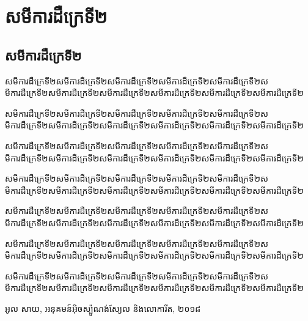 \documentclass[11pt,a5paper]{header}
\begin{document}
    \frontmatter{}
    \tableofcontents
    \mainmatter{}
    \chapter{សមីការដឺក្រេទី២}
    \section{សមីការដឺក្រេទី២}
    \begin{definition}
        សមីការដឺក្រេទី២សមីការដឺក្រេទី២សមីការដឺក្រេទី២សមីការដឺក្រេទី២សមីការដឺក្រេទី២សមីការដឺក្រេទី២សមីការដឺក្រេទី២សមីការដឺក្រេទី២សមីការដឺក្រេទី២សមីការដឺក្រេទី២សមីការដឺក្រេទី២
    \end{definition}
\begin{theorem}
    សមីការដឺក្រេទី២សមីការដឺក្រេទី២សមីការដឺក្រេទី២សមីការដឺក្រេទី២សមីការដឺក្រេទី២សមីការដឺក្រេទី២សមីការដឺក្រេទី២សមីការដឺក្រេទី២សមីការដឺក្រេទី២សមីការដឺក្រេទី២សមីការដឺក្រេទី២
\end{theorem}
\begin{example}
    សមីការដឺក្រេទី២សមីការដឺក្រេទី២សមីការដឺក្រេទី២សមីការដឺក្រេទី២សមីការដឺក្រេទី២សមីការដឺក្រេទី២សមីការដឺក្រេទី២សមីការដឺក្រេទី២សមីការដឺក្រេទី២សមីការដឺក្រេទី២សមីការដឺក្រេទី២
\end{example}
\begin{exercise}
    សមីការដឺក្រេទី២សមីការដឺក្រេទី២សមីការដឺក្រេទី២សមីការដឺក្រេទី២សមីការដឺក្រេទី២សមីការដឺក្រេទី២សមីការដឺក្រេទី២សមីការដឺក្រេទី២សមីការដឺក្រេទី២សមីការដឺក្រេទី២សមីការដឺក្រេទី២
\end{exercise}
\begin{property}
    សមីការដឺក្រេទី២សមីការដឺក្រេទី២សមីការដឺក្រេទី២សមីការដឺក្រេទី២សមីការដឺក្រេទី២សមីការដឺក្រេទី២សមីការដឺក្រេទី២សមីការដឺក្រេទី២សមីការដឺក្រេទី២សមីការដឺក្រេទី២សមីការដឺក្រេទី២
\end{property}
\begin{generality}
    សមីការដឺក្រេទី២សមីការដឺក្រេទី២សមីការដឺក្រេទី២សមីការដឺក្រេទី២សមីការដឺក្រេទី២សមីការដឺក្រេទី២សមីការដឺក្រេទី២សមីការដឺក្រេទី២សមីការដឺក្រេទី២សមីការដឺក្រេទី២សមីការដឺក្រេទី២
\end{generality}
    \begin{remark}
        សមីការដឺក្រេទី២សមីការដឺក្រេទី២សមីការដឺក្រេទី២សមីការដឺក្រេទី២សមីការដឺក្រេទី២សមីការដឺក្រេទី២សមីការដឺក្រេទី២សមីការដឺក្រេទី២សមីការដឺក្រេទី២សមីការដឺក្រេទី២សមីការដឺក្រេទី២
    \end{remark}
    \backmatter
    \begin{thebibliography}{9}
        អូល សាយ, អនុគមន៍អ៊ិចស្ប៉ូណង់ស្យែល និងលោការីត, ២០១៨
    \end{thebibliography}
\end{document}

